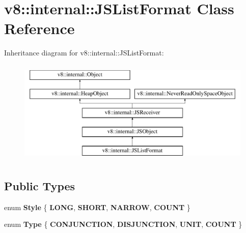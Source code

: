 \hypertarget{classv8_1_1internal_1_1JSListFormat}{}\section{v8\+:\+:internal\+:\+:J\+S\+List\+Format Class Reference}
\label{classv8_1_1internal_1_1JSListFormat}
Inheritance diagram for v8\+:\+:internal\+:\+:J\+S\+List\+Format\+:\begin{figure}[H]
\begin{center}
\leavevmode
\includegraphics[height=5.000000cm]{classv8_1_1internal_1_1JSListFormat}
\end{center}
\end{figure}
\subsection*{Public Types}
\begin{DoxyCompactItemize}
\item 
\mbox{\label{classv8_1_1internal_1_1JSListFormat_a892a16c3000a9258964ced915a9d35c6}} 
enum {\bfseries Style} \{ {\bfseries L\+O\+NG}, 
{\bfseries S\+H\+O\+RT}, 
{\bfseries N\+A\+R\+R\+OW}, 
{\bfseries C\+O\+U\+NT}
 \}
\item 
\mbox{\label{classv8_1_1internal_1_1JSListFormat_ac1219974413f22ca3c6e35ccc6134701}} 
enum {\bfseries Type} \{ {\bfseries C\+O\+N\+J\+U\+N\+C\+T\+I\+ON}, 
{\bfseries D\+I\+S\+J\+U\+N\+C\+T\+I\+ON}, 
{\bfseries U\+N\+IT}, 
{\bfseries C\+O\+U\+NT}
 \}
\end{DoxyCompactItemize}
